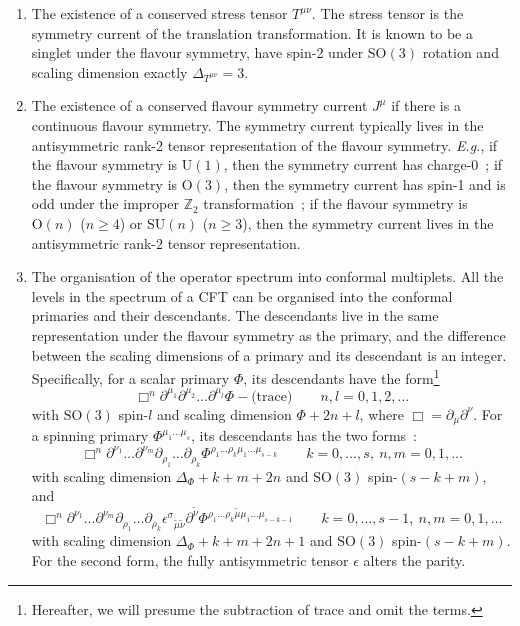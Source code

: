 \documentclass{timesjhep}
\begin{document}
\begin{enumerate}
    \item The existence of a conserved stress tensor $T^{\mu\nu}$. The stress tensor is the symmetry current of the translation transformation. It is known to be a singlet under the flavour symmetry, have spin-2 under $\mathrm{SO}(3)$ rotation and scaling dimension exactly $\Delta_{T^{\mu\nu}}=3$. 
    \item The existence of a conserved flavour symmetry current $J^\mu$ if there is a continuous flavour symmetry. The symmetry current typically lives in the antisymmetric rank-2 tensor representation of the flavour symmetry. \textit{E.g.}, if the flavour symmetry is $\mathrm{U}(1)$, then the symmetry current has charge-0~; if the flavour symmetry is $\mathrm{O}(3)$, then the symmetry current has spin-1 and is odd under the improper $\mathbb{Z}_2$ transformation~; if the flavour symmetry is $\mathrm{O}(n)$ ($n\ge 4$) or $\mathrm{SU}(n)$ ($n\ge 3$), then the symmetry current lives in the antisymmetric rank-$2$ tensor representation. 
    \item The organisation of the operator spectrum into conformal multiplets. All the levels in the spectrum of a CFT can be organised into the conformal primaries and their descendants. The descendants live in the same representation under the flavour symmetry as the primary, and the difference between the scaling dimensions of a primary and its descendant is an integer. Specifically, for a scalar primary $\Phi$, its descendants have the form\footnote{Hereafter, we will presume the subtraction of trace and omit the terms.}
    \begin{equation*}
        \Box^n\partial^{\mu_1}\partial^{\mu_2}\dots\partial^{\mu_l}\Phi-\textrm{(trace)}\qquad n,l=0,1,2,\dots
    \end{equation*}
    with $\mathrm{SO}(3)$ spin-$l$ and scaling dimension $\Phi+2n+l$, where $\Box=\partial_\mu\partial^\nu$. For a spinning primary $\Phi^{\mu_1\dots\mu_s}$, its descendants has the two forms~: 
    \begin{equation*}
        \Box^n\partial^{\nu_1}\dots\partial^{\nu_m}\partial_{\rho_1}\dots\partial_{\rho_k}\Phi^{\rho_1\dots\rho_{k}\mu_1\dots \mu_{s-k}}\qquad k=0,\dots,s,\ n,m=0,1,\dots
    \end{equation*}
    with scaling dimension $\Delta_\Phi+k+m+2n$ and $\mathrm{SO}(3)$ spin-$(s-k+m)$, and 
    \begin{equation*}
        \Box^n\partial^{\nu_1}\dots\partial^{\nu_m}\partial_{\rho_1}\dots\partial_{\rho_k}\epsilon^{\sigma}{}_{\tilde{\mu}\tilde{\nu}}\partial^{\tilde{\nu}}\Phi^{\rho_1\dots\rho_{k}\tilde{\mu}\mu_1\dots \mu_{s-k-1}}\qquad k=0,\dots,s-1,\ n,m=0,1,\dots
    \end{equation*}
    with scaling dimension $\Delta_\Phi+k+m+2n+1$ and $\mathrm{SO}(3)$ spin-$(s-k+m)$. For the second form, the fully antisymmetric tensor $\epsilon$ alters the parity. 
\end{enumerate} 
\end{document}
